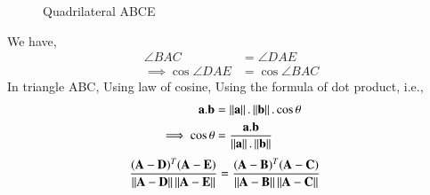 \documentclass[journal,12pt,twocolumn]{IEEEtran}
\begin{document}
\begin{figure}[!htb]
	\centering
    \centering
\resizebox{\columnwidth}{!}{}
	\caption{Quadrilateral ABCE}
\end{figure}
We have,
\begin{align}
 \angle BAC &= \angle DAE \label{eq3}\\
 \implies \cos\angle DAE  &=  \cos\angle BAC \label{eq4}
\end{align}
In  triangle ABC, Using law of cosine,
Using the formula of dot product, i.e.,
\begin{align}
\mathbf{a}.\mathbf{b}&=\left\lVert\mathbf{a}\right\rVert. \left\lVert\mathbf{b}\right\rVert. \cos\theta \label{eq5}\\
\implies \cos\theta &= \frac{\mathbf{a}.\mathbf{b}}{\left\lVert\mathbf{a}\right\rVert.\left\lVert\mathbf{b}\right\rVert} \label{eq6}
\end{align}
\begin{align}
 \frac{(\mathbf A -\mathbf D)^T(\mathbf{A}-\mathbf{E})} {\left\lVert\mathbf{A}-\mathbf{D}\right\rVert \left\lVert\mathbf{A}-\mathbf{E}\right\rVert } 
 &= \frac{(\mathbf A -\mathbf B)^T(\mathbf{A}-\mathbf{C})} {\left\lVert\mathbf{A}-\mathbf{B}\right\rVert \left\lVert\mathbf{A}-\mathbf{C}\right\rVert}\label{eq7}
 \end{align}
\end{document}
